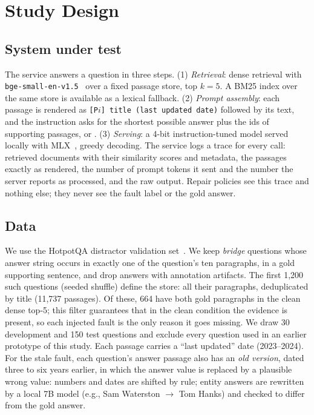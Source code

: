 \section{Study Design}\label{sec:design}

\subsection{System under test}
The service answers a question in three steps. (1) \emph{Retrieval}: dense retrieval with
\texttt{bge-small-en-v1.5}~\cite{xiao2023cpack} over a fixed passage store, top $k{=}5$. A BM25 index
over the same store is available as a lexical fallback. (2) \emph{Prompt assembly}: each passage is
rendered as \texttt{[P$i$] title (last updated date)} followed by its text, and the instruction asks
for the shortest possible answer plus the ids of supporting passages, or \INS{}.
(3) \emph{Serving}: a 4-bit instruction-tuned model served locally with MLX~\cite{mlx2023}, greedy
decoding. The service logs a trace for every call: retrieved documents with their similarity scores
and metadata, the passages exactly as rendered, the number of prompt tokens it sent and the number
the server reports as processed, and the raw output. Repair policies see this trace and nothing else;
they never see the fault label or the gold answer.

\subsection{Data}
We use the HotpotQA distractor validation set~\cite{yang2018hotpotqa}. We keep \emph{bridge}
questions whose answer string occurs in exactly one of the question's ten paragraphs, in a gold
supporting sentence, and drop answers with annotation artifacts. The first 1{,}200 such questions
(seeded shuffle) define the store: all their paragraphs, deduplicated by title (11{,}737 passages).
Of these, 664 have both gold paragraphs in the clean dense top-5; this filter guarantees that in the
clean condition the evidence is present, so each injected fault is the only reason it goes missing.
We draw 30 development and 150 test questions and exclude every question used in an earlier
prototype of this study. Each passage carries a ``last updated'' date (2023--2024). For the stale
fault, each question's answer passage also has an \emph{old version}, dated three to six years
earlier, in which the answer value is replaced by a plausible wrong value: numbers and dates are
shifted by rule; entity answers are rewritten by a local 7B model (e.g., Sam Waterston $\to$ Tom
Hanks) and checked to differ from the gold answer.

